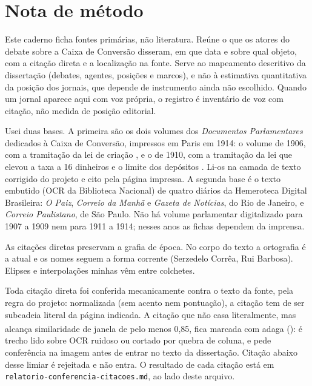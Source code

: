 \chapter*{Nota de método}

Este caderno ficha fontes primárias, não literatura. Reúne o que os atores do
debate sobre a Caixa de Conversão disseram, em que data e sobre qual objeto, com
a citação direta e a localização na fonte. Serve ao mapeamento descritivo da
dissertação (debates, agentes, posições e marcos), e não à estimativa
quantitativa da posição dos jornais, que depende de instrumento ainda não
escolhido. Quando um jornal aparece aqui com voz própria, o registro é
inventário de voz com citação, não medida de posição editorial.


Usei duas bases. A primeira são os dois volumes dos \textit{Documentos
Parlamentares} dedicados à Caixa de Conversão, impressos em Paris em 1914: o
volume de 1906, com a tramitação da lei de criação \cite{brasil1906caixa}, e o
de 1910, com a tramitação da lei que elevou a taxa a 16 dinheiros e o limite dos
depósitos \cite{brasil1910taxa16}. Li-os na camada de texto corrigido do projeto
e cito pela página impressa. A segunda base é o texto embutido (OCR da
Biblioteca Nacional) de quatro diários da Hemeroteca Digital Brasileira:
\textit{O Paiz}, \textit{Correio da Manhã} e \textit{Gazeta de Notícias}, do Rio
de Janeiro, e \textit{Correio Paulistano}, de São Paulo. Não há volume
parlamentar digitalizado para 1907 a 1909 nem para 1911 a 1914; nesses anos as
fichas dependem da imprensa.


As citações diretas preservam a grafia de época. No corpo do texto a ortografia
é a atual e os nomes seguem a forma corrente (Serzedelo Corrêa, Rui Barbosa).
Elipses e interpolações minhas vêm entre colchetes.

Toda citação direta foi conferida mecanicamente contra o texto da fonte, pela
regra do projeto: normalizada (sem acento nem pontuação), a citação tem de ser
subcadeia literal da página indicada. A citação que não casa literalmente, mas
alcança similaridade de janela de pelo menos 0,85, fica marcada com adaga
(\textsuperscript{\dag}): é trecho lido sobre OCR ruidoso ou cortado por quebra
de coluna, e pede conferência na imagem antes de entrar no texto da dissertação.
Citação abaixo desse limiar é rejeitada e não entra. O resultado de cada
citação está em \texttt{relatorio-conferencia-citacoes.md}, ao lado deste
arquivo.

